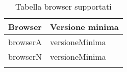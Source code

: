 \label{browser}
\begin{longtable}{XX}
\toprule
\textbf{Browser} & \textbf{Versione minima}\\
\midrule
browserA&versioneMinima\\
\midrule
browserN&versioneMinima\\
\bottomrule
\caption{Tabella browser supportati}
\end{longtable}